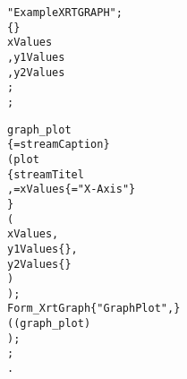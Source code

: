 \begin{boxedminipage}[t]{\linewidth}
\begin{alltt}
\DESCRIPTION "Example XRTGRAPH";
\DATAPOOL
  \REAL \{\EDITABLE\}
    xValues
   ,y1Values
   ,y2Values
   ;
\END \DATAPOOL;

\UIMANAGER
  \XRTGRAPH
    graph_plot
      \{ \CAPTION = streamCaption \}
      ( plot
           \{ streamTitel
           , \XAXIS = xValues \{ \LABEL = "X-Axis" \}
           \}
         (
           xValues,
           y1Values \{\YAXISONE\},
           y2Values \{\YAXISTWO\}
         )
      );
  \FORM
    Form_XrtGraph \{"Graph Plot", \HIDECYCLE\}
      ( ( graph_plot )
      );
\END \UIMANAGER;
\END.
\end{alltt}
\end{boxedminipage}

